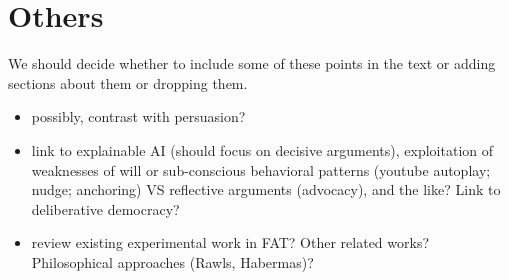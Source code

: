 \documentclass[version=3.21, pagesize, twoside=off, bibliography=totoc, DIV=calc, fontsize=12pt, a4paper, french, english]{scrartcl}
\begin{document}
\section{Others}
We should decide whether to include some of these points in the text or adding sections about them or dropping them.
\begin{itemize}
	\item possibly, contrast with persuasion?
	\item link to explainable AI (should focus on decisive arguments), exploitation of weaknesses of will or sub-conscious behavioral patterns (youtube autoplay; nudge; anchoring) VS reflective arguments (advocacy), and the like? Link to deliberative democracy?
	\item review existing experimental work in FAT? Other related works? Philosophical approaches (Rawls, Habermas)?
\end{itemize}


\end{document}

